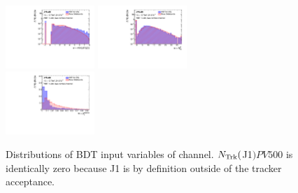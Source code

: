 \begin{figure}[htbp]
 \includegraphics[width=0.3\textwidth]{figures/VBF/BDT_input_mindRJ2_Ex2cen.pdf}
 \includegraphics[width=0.3\textwidth]{figures/VBF/BDT_input_QGTaggerJ22cen.pdf}\\
 \includegraphics[width=0.3\textwidth]{figures/VBF/BDT_input_pT_balance2cen.pdf}\\

\caption{Distributions of BDT input variables of \twocentral channel.  $N_{\rm Trk}($J1$)PV500$ is identically zero because J1 is by definition outside of the tracker acceptance.}
  \label{fig:vbf-BDTInputs2cen}
\end{figure}

